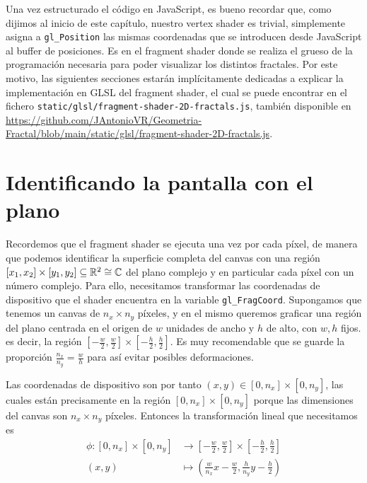 Una vez estructurado el código en JavaScript, es bueno recordar que, como dijimos al inicio de este capítulo, nuestro vertex shader es trivial, simplemente asigna a \verb|gl_Position| las mismas coordenadas que se introducen desde JavaScript al buffer de posiciones. Es en el fragment shader donde se realiza el grueso de la programación necesaria para poder visualizar los distintos fractales. Por este motivo, las siguientes secciones estarán implícitamente dedicadas a explicar la implementación en GLSL del fragment shader, el cual se puede encontrar en el fichero \verb|static/glsl/fragment-shader-2D-fractals.js|, también disponible en \url{https://github.com/JAntonioVR/Geometria-Fractal/blob/main/static/glsl/fragment-shader-2D-fractals.js}. 

\section{Identificando la pantalla con el plano}
\label{section:pantalla-plano}


Recordemos que el fragment shader se ejecuta una vez por cada píxel, de manera que podemos identificar la superficie completa del canvas con una región $[x_1,x_2]\times [y_1,y_2]\subseteq\mathbb{R}^2\cong\mathbb{C}$ del plano complejo y en particular cada píxel con un número complejo. Para ello, necesitamos transformar las coordenadas de dispositivo que el shader encuentra en la variable \verb|gl_FragCoord|. Supongamos que tenemos un canvas de $n_x\times n_y$ píxeles, y en el mismo queremos graficar una región del plano centrada en el origen de $w$ unidades de ancho y $h$ de alto, con $w,h$ fijos. es decir, la región $\left[-\frac{w}{2},\frac{w}{2}\right]\times\left[-\frac{h}{2},\frac{h}{2}\right]$. Es muy recomendable que se guarde la proporción $\frac{n_x}{n_y}=\frac{w}{h}$ para así evitar posibles deformaciones.

Las coordenadas de dispositivo son por tanto $(x,y)\in[0,n_x]\times[0,n_y]$, las cuales están precisamente en la región $[0,n_x]\times[0,n_y]$ porque las dimensiones del canvas son $n_x\times n_y$ píxeles. Entonces la transformación lineal que necesitamos es 
\begin{equation}
\label{eq:transformacion-lineal-1}
\begin{split}
    \phi:[0,n_x]\times[0,n_y] & \longrightarrow \left[-\frac{w}{2},\frac{w}{2}\right]\times\left[-\frac{h}{2},\frac{h}{2}\right] \\
    (x,y) & \longmapsto \left(\frac{w}{n_x}x-\frac{w}{2},\frac{h}{n_y}y-\frac{h}{2}\right)
\end{split}
\end{equation}

